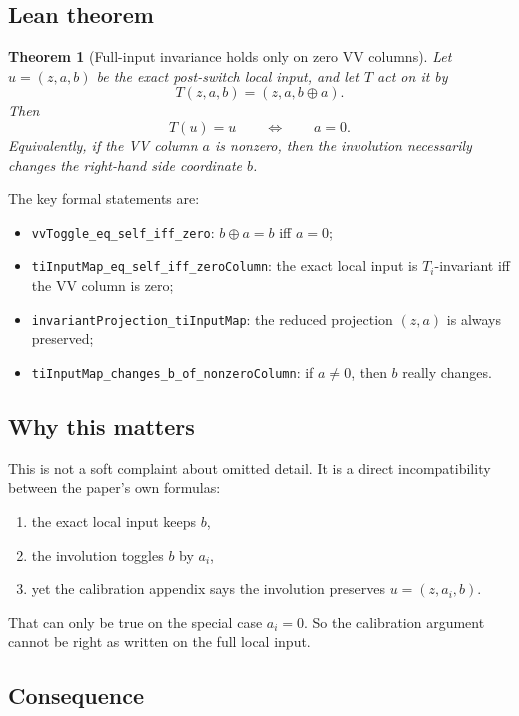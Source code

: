\documentclass[11pt]{article}
\newtheorem{theorem}{Theorem}[section]
\theoremstyle{remark}
\begin{document}
\subsection{Lean theorem}

\begin{theorem}[Full-input invariance holds only on zero VV columns]
Let \(u = (z,a,b)\) be the exact post-switch local input, and let \(T\) act on it by
\[
  T(z,a,b) = (z,a,b \oplus a).
\]
Then
\[
  T(u) = u
  \qquad\Longleftrightarrow\qquad
  a = 0.
\]
Equivalently, if the VV column \(a\) is nonzero, then the involution necessarily changes the
right-hand side coordinate \(b\).
\end{theorem}

\noindent
The key formal statements are:
\begin{itemize}[leftmargin=1.5em]
  \item \texttt{vvToggle\_eq\_self\_iff\_zero}: \(b \oplus a = b\) iff \(a=0\);
  \item \texttt{tiInputMap\_eq\_self\_iff\_zeroColumn}: the exact local input is \(T_i\)-invariant
  iff the VV column is zero;
  \item \texttt{invariantProjection\_tiInputMap}: the reduced projection \((z,a)\) is always
  preserved;
  \item \texttt{tiInputMap\_changes\_b\_of\_nonzeroColumn}: if \(a \neq 0\), then \(b\) really
  changes.
\end{itemize}

\subsection{Why this matters}

This is not a soft complaint about omitted detail.  It is a direct incompatibility between the
paper's own formulas:
\begin{enumerate}[leftmargin=1.5em]
  \item the exact local input keeps \(b\),
  \item the involution toggles \(b\) by \(a_i\),
  \item yet the calibration appendix says the involution preserves \(u=(z,a_i,b)\).
\end{enumerate}

That can only be true on the special case \(a_i=0\).  So the calibration argument cannot be right
as written on the full local input.

\subsection{Consequence}
\end{document}
